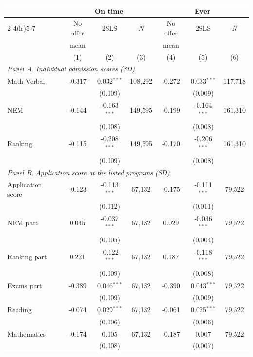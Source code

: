 \begin{tabular}{lcccccc}
\toprule
 & \multicolumn{3}{c}{On time} & \multicolumn{3}{c}{Ever}\\
\cmidrule(lr){2-4}\cmidrule(lr){5-7}
 & No offer & 2SLS & $N$ & No offer & 2SLS & $N$\\
 & mean &  &  & mean &  & \\
 & (1) & (2) & (3) & (4) & (5) & (6)\\
\midrule
\multicolumn{7}{l}{\textit{Panel A. Individual admission scores (SD)}}\\
Math-Verbal & -0.317 & 0.032$^{***}$ & 108,292 & -0.272 & 0.033$^{***}$ & 117,718\\
 &  & (0.009) &  &  & (0.009) & \\
NEM & -0.144 & -0.163$^{***}$ & 149,595 & -0.199 & -0.164$^{***}$ & 161,310\\
 &  & (0.008) &  &  & (0.008) & \\
Ranking & -0.115 & -0.208$^{***}$ & 149,595 & -0.170 & -0.206$^{***}$ & 161,310\\
 &  & (0.009) &  &  & (0.008) & \\
\midrule
\multicolumn{7}{l}{\textit{Panel B. Application score at the listed programs (SD)}}\\
\quad Application score & -0.123 & -0.113$^{***}$ & 67,132 & -0.175 & -0.111$^{***}$ & 79,522\\
 &  & (0.012) &  &  & (0.011) & \\
\quad\quad NEM part & 0.045 & -0.037$^{***}$ & 67,132 & 0.029 & -0.036$^{***}$ & 79,522\\
 &  & (0.005) &  &  & (0.004) & \\
\quad\quad Ranking part & 0.221 & -0.122$^{***}$ & 67,132 & 0.187 & -0.118$^{***}$ & 79,522\\
 &  & (0.009) &  &  & (0.008) & \\
\quad\quad Exams part & -0.389 & 0.046$^{***}$ & 67,132 & -0.390 & 0.043$^{***}$ & 79,522\\
 &  & (0.009) &  &  & (0.009) & \\
\quad\quad\quad Reading & -0.074 & 0.029$^{***}$ & 67,132 & -0.061 & 0.025$^{***}$ & 79,522\\
 &  & (0.006) &  &  & (0.006) & \\
\quad\quad\quad Mathematics & -0.174 & 0.005 & 67,132 & -0.187 & 0.007 & 79,522\\
 &  & (0.008) &  &  & (0.007) & \\

\end{tabular}
